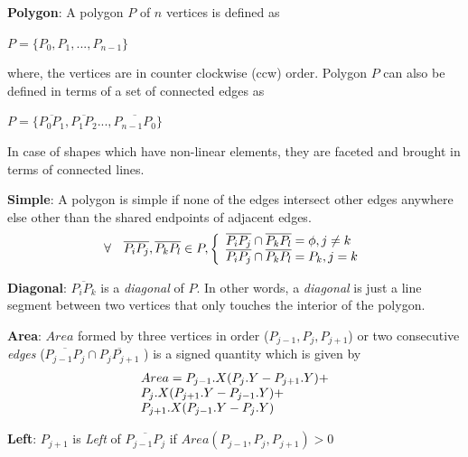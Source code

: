 \begin{list}{}{}
\item {\bf Polygon}: A polygon $P$ of $n$ vertices is defined as 

$P = \{P_0,P_1,...,P_{n-1}\}$

where, the vertices are in counter clockwise (ccw) order. Polygon $P$ can also be defined in terms of a set of connected edges as  

$P = \{\overline{P_0 P_1},\overline{P_1 P_2}...,\overline{P_{n-1} P_0}\}$

In case of shapes which have non-linear elements, they are faceted and brought in terms of connected lines.

\item {\bf Simple}: A polygon is simple if none of the edges intersect other edges anywhere else other than the shared endpoints of adjacent edges.
\begin{displaymath}
\forall \quad \overline{P_i P_j}, \overline{P_k P_l} \in P, \left\{ 
  \begin{array}{l l}
     \overline{P_i P_j} \cap \overline{P_k P_l} = \phi , j \neq k\\
     \overline{P_i P_j} \cap \overline{P_k P_l} = P_k  , j = k
  \end{array} \right.
\end{displaymath}

\item {\bf Diagonal}: $\overline{P_i P_k}$ is a {\em diagonal} of $P$.  In other words, a {\em diagonal} is just a line segment between two vertices that only touches the interior of the polygon.

\item {\bf Area}: $Area$ formed by three vertices in order ($ P_{j-1}, P_j,  P_{j+1}$) or two consecutive {\em edges} ($ \overline{P_{j-1} P_j} \cap \overline{P_j P_{j+1}}$ ) is a signed quantity which is given by
\begin{displaymath}
\begin{array}{l l}
Area = P_{j-1}.X ( P_j.Y - P_{j+1}.Y) + \\
P_j.X (P_{j+1}.Y -  P_{j-1}.Y) + \\
P_{j+1}.X ( P_{j-1}.Y - P_j.Y) 
 \end{array} 
\end{displaymath}

\item {\bf Left}: $P_{j+1}$ is {\em Left} of $ \overline{P_{j-1} P_j}$ if $Area( P_{j-1}, P_j,  P_{j+1}) > 0$ 


\end{list}
